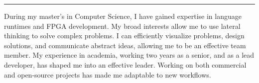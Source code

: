 \documentclass{developercv} %
\begin{document}
{{	\vspace*{-\topLen}
	\hspace*{\fill}\rule{.4pt}{\topLen+\bottomLen}\hspace*{\fill}
	\vspace*{-\bottomLen}
}

\vspace*{-\baselineskip}
\begin{multicols}{2}

	\RTLpar\sloppy

	During my master's in Computer Science, I have gained expertise in language runtimes and FPGA development.
	My broad interests allow me to use lateral thinking to solve complex problems.
	I can efficiently visualize problems, design solutions, and communicate abstract ideas, allowing me to be an effective team member.
	My experience in academia, working two years as a senior, and as a lead developer, has shaped me into an effective leader.
	Working on both commercial and open-source projects has made me adaptable to new workflows.

	\vspace*{\fill}
	\columnbreak

	\justifying \sloppy


	\vspace*{-4pt}

	\vspace*{5pt}

	\ifdefined{}  \fi

	\vspace*{-4pt}
	\vspace*{5pt}


	\vspace*{-4pt}

	\vspace*{\fill}
\end{multicols}
}

\justifying
\end{document}
